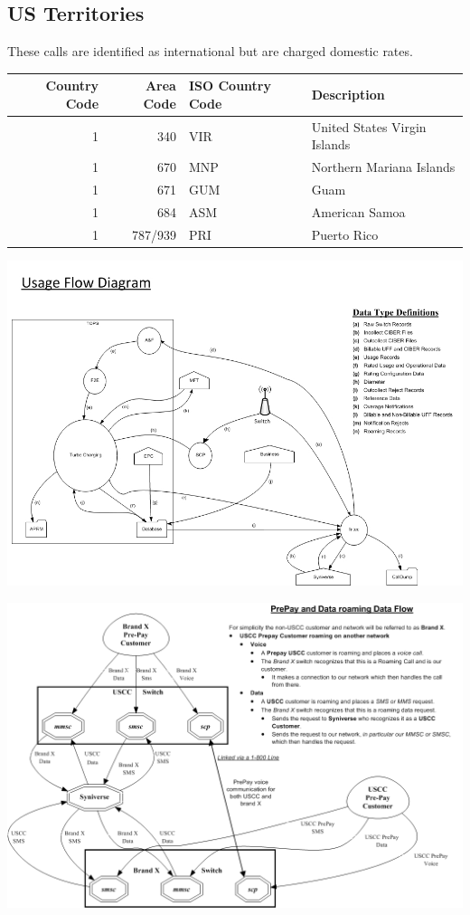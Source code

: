 \documentclass[12pt,twoside]{article}
\begin{document}
\subsection{US Territories}
\label{sec:orgheadline24}
These calls are identified as international but are charged
domestic rates.
\begin{center}
\begin{tabular}{rrll}
\hline
Country Code & Area Code & ISO Country Code & Description\\
\hline
1 & 340 & VIR & United States Virgin Islands\\
1 & 670 & MNP & Northern Mariana Islands\\
1 & 671 & GUM & Guam\\
1 & 684 & ASM & American Samoa\\
1 & 787/939 & PRI & Puerto Rico\\
\hline
\end{tabular}
\end{center}

\newpage 
\begin{landscape}  
\includegraphics[width=.9\linewidth]{Pictures/usage_flow.jpg}


\end{landscape} 
\newpage

\begin{landscape}  
\includegraphics[width=.9\linewidth]{Pictures/roamingPrePay.png}
\end{landscape} 
\newpage
\end{document}
